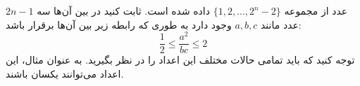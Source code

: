 \p
$2n-1$
عدد از مجموعه 
$\{1, 2, ..., 2^n-2\}$
داده شده است. ثابت کنید در بین آن‌ها سه عدد مانند
$a, b, c $
وجود دارد به طوری که رابطه زیر بین آن‌ها برقرار باشد:
$$\frac{1}{2} \leq \frac{a^2}{bc} \leq 2$$
توجه کنید که باید تمامی حالات مختلف این اعداد را در نظر بگیرید. به عنوان مثال، این اعداد می‌توانند یکسان باشند.